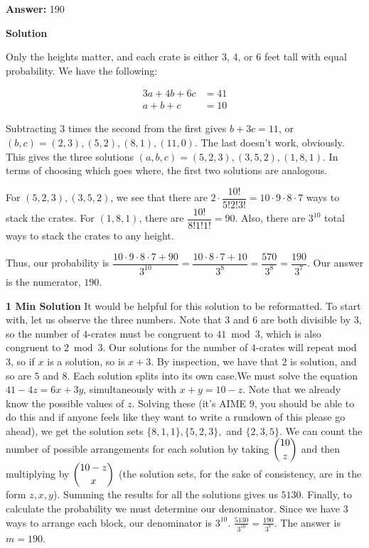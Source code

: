 \begin{enumerate}
 
 \textbf{Answer: }190



\textbf{Solution}

Only the heights matter, and each crate is either 3, 4, or 6 feet tall with equal probability. We have the following:

 
 \begin{align*}3a + 4b + 6c &= 41\\ a + b + c &= 10\end{align*}


 Subtracting 3 times the second from the first gives $b + 3c = 11$, or $(b,c) = (2,3),(5,2),(8,1),(11,0)$. The last doesn't work, obviously. This gives the three solutions $(a,b,c) = (5,2,3),(3,5,2),(1,8,1)$. In terms of choosing which goes where, the first two solutions are analogous.

 For $(5,2,3),(3,5,2)$, we see that there are $2\cdot\dfrac{10!}{5!2!3!} = 10\cdot9\cdot8\cdot7$ ways to stack the crates. For $(1,8,1)$, there are $\dfrac{10!}{8!1!1!} = 90$. Also, there are $3^{10}$ total ways to stack the crates to any height.

 Thus, our probability is $\dfrac{10\cdot9\cdot8\cdot7 + 90}{3^{10}} = \dfrac{10\cdot8\cdot7 + 10}{3^{8}} = \dfrac{570}{3^8} = \dfrac{190}{3^{7}}$. Our answer is the numerator, $\boxed{190}$.

 \textbf{1 Min Solution} It would be helpful for this solution to be reformatted. To start with, let us observe the three numbers. Note that $3$ and $6$ are both divisible by $3$, so the number of $4$-crates must be congruent to $41\bmod{3}$, which is also congruent to $2\bmod{3}$. Our solutions for the number of $4$-crates will repeat mod $3$, so if $x$ is a solution, so is $x+3$. By inspection, we have that $2$ is solution, and so are $5$ and $8$. Each solution splits into its own case.We must solve the equation $41-4z=6x+3y$, simultaneously with $x+y=10-z$. Note that we already know the possible values of $z$. Solving these (it's AIME $9$, you should be able to do this and if anyone feels like they want to write a rundown of this please go ahead), we get the solution  sets $\{8,1,1\},\{5,2,3\},$ and $\{2,3,5\}$. We can count the number of possible arrangements for each solution by taking $\dbinom{10}{z}$ and then multiplying by $\dbinom{10-z}{x}$ (the solution sets, for the sake of consistency, are in the form $z,x,y$). Summing the results for all the solutions gives us $5130$. Finally, to calculate the probability we must determine our denominator. Since we have $3$ ways to arrange each block, our denominator is $3^{10}$. $\frac{5130}{3^{10}}=\frac{190}{3^7}$. The answer is $m=\boxed{190}$.


\end{enumerate}
